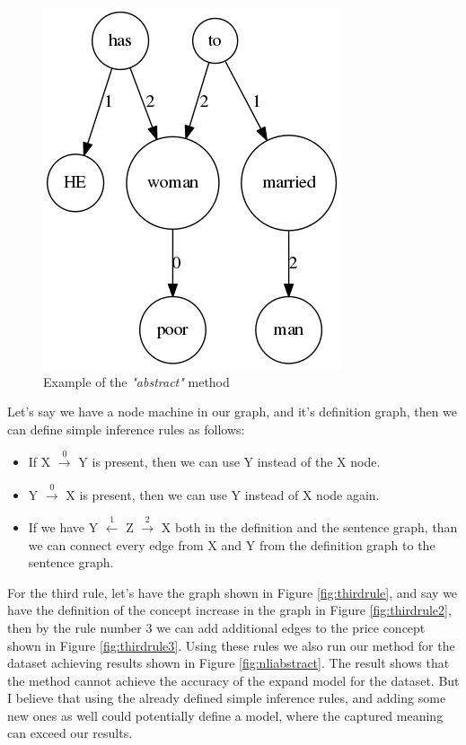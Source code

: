 \begin{figure}[h]
	\centering
	\includegraphics[scale=0.4]{figures/mypoorabs}
	\caption{Example of the \textit{"abstract"} method}
	\label{fig:mypoorabs}
\end{figure}
Let's say we have a node machine in our graph, and it's definition graph, then we can define simple inference rules as follows:
\begin{itemize}
	\item If X $\xrightarrow0$ Y is present, then we can use Y instead of the X node.
	\item Y $\xrightarrow0$ X is present, then we can use Y instead of X node again.
	\item If we have Y $\xleftarrow1$ Z $\xrightarrow2$ X  both in the definition and the sentence graph, than we can connect every edge from X and Y from the definition graph to the sentence graph.
\end{itemize}
For the third rule, let's have the graph shown in Figure \ref{fig:thirdrule}, and say we have the definition of the concept increase in the graph in Figure \ref{fig:thirdrule2}, then by the rule number 3 we can add  additional edges to the price concept shown in Figure \ref{fig:thirdrule3}. Using these rules we also run our method for the dataset achieving results shown in Figure \ref{fig:nliabstract}. The result shows that the method cannot achieve the accuracy of the expand model for the dataset. But I believe that using the already defined simple inference rules, and adding some new ones as well could potentially define a model, where the captured meaning can exceed our results.


